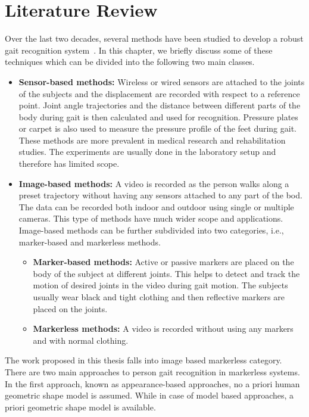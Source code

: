 \chapter{Literature Review} \label{ch:literature_review}
Over the last two decades, several methods have been studied to develop a robust gait recognition system~\cite{Rida_19}. In this chapter, we briefly discuss some of these techniques which can be divided into the following two main classes.

\begin{itemize}
	\item \textbf{Sensor-based methods:} Wireless or wired sensors are attached to the joints of the subjects
	and the displacement are recorded with respect to a reference point. Joint angle trajectories and the distance between different parts of the body during	gait is then calculated and used for recognition. Pressure plates or carpet is also used to measure the pressure profile of the feet during gait. These methods are more prevalent in medical research and rehabilitation studies. The experiments are usually done in the laboratory setup and therefore has limited scope.
	
	\item \textbf{Image-based methods:} A video is recorded as the person walks along a preset trajectory without having any sensors attached to any part of the bod. The data can be recorded both indoor and outdoor using single or multiple cameras. This type of methods have much wider scope and applications. Image-based methods can be further subdivided into two categories, i.e., marker-based and markerless methods.
	
	\begin{itemize}
		\item \textbf{Marker-based methods: } Active or passive markers are placed on the body of the subject at different joints. This helps to detect and track the motion of desired joints in the video during gait motion. The subjects usually wear black and tight clothing and then reflective markers are placed on the joints. 
		
		\item \textbf{Markerless methods: } A video is recorded without using any markers and with normal clothing.
	\end{itemize}
\end{itemize}


The work proposed in this thesis falls into image based markerless category. There are two main approaches to person gait recognition in markerless systems. In the first approach, known as appearance-based approaches, no a priori human geometric shape model is assumed. While in case of model based approaches, a priori geometric shape model is available.

